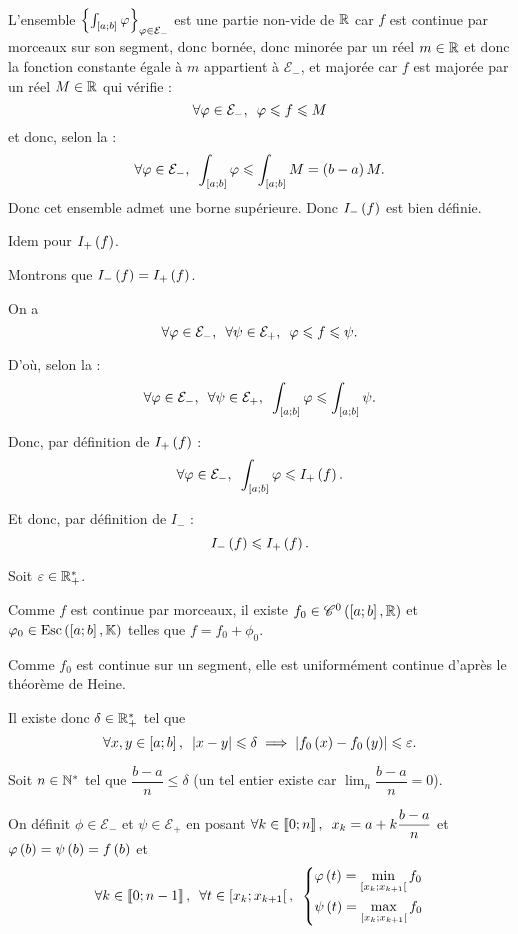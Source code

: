 \begin{dem}~\\
\newcommand{\Em}{\mathcal{E}_-}
\newcommand{\Ep}{\mathcal{E}_+}
L'ensemble \(\accol{\int_{\intervii{a}{b}}\phi}_{\phi\in\Em}\) est une partie non-vide de \(\mathbb{R}\) car \(f\) est continue par morceaux sur son segment, donc bornée, donc minorée par un réel \(m\in\mathbb{R}\) et donc la fonction constante égale à \(m\) appartient à \(\Em\), et majorée car \(f\) est majorée par un réel \(M\in\mathbb{R}\) qui vérifie : \[\quantifs{\forall\phi\in\Em}\phi\leq f\leq M\] et donc, selon la  : \[\quantifs{\forall\phi\in\Em}\int_{\intervii{a}{b}}\phi\leq\int_{\intervii{a}{b}}M=\paren{b-a}M.\] Donc cet ensemble admet une borne supérieure. Donc \(I_-\left(f\right)\) est bien définie.

Idem pour \(I_+\left(f\right)\).

Montrons que \(I_-\left(f\right)=I_+\left(f\right)\).

\leqbox

On a \[\quantifs{\forall\phi\in\Em;\forall\psi\in\Ep}\phi\leq f\leq\psi.\]

D'où, selon la  : \[\quantifs{\forall\phi\in\Em;\forall\psi\in\Ep}\int_{\intervii{a}{b}}\phi\leq\int_{\intervii{a}{b}}\psi.\]

Donc, par définition de \(I_+\left(f\right)\) : \[\quantifs{\forall\phi\in\Em}\int_{\intervii{a}{b}}\phi\leq I_+\paren{f}.\]

Et donc, par définition de \(I_-\) : \[I_-\left(f\right)\leqslant I_+\left(f\right).\]

\geqbox

Soit \(\varepsilon\in\mathbb{R}_+^*\).

Comme \(f\) est continue par morceaux, il existe \(f_0\in\mathscr{C}^{0}\left(\left[a;b\right],\mathbb{R}\right)\) et \(\phi_0\in\Esc\) telles que \(f=f_0+\phi_0\).

Comme \(f_0\) est continue sur un segment, elle est uniformément continue d'après le théorème de Heine.

Il existe donc \(\delta\in\mathbb{R}_+^*\) tel que \[\quantifs{\forall x,y\in\intervii{a}{b}}\abs{x-y}\leq\delta\imp\abs{f_0\paren{x}-f_0\paren{y}}\leq\epsilon.\]

Soit \(n\in\mathbb{N}^*\) tel que \(\dfrac{b-a}{n}\leq\delta\) (un tel entier existe car \(\lim_n\dfrac{b-a}{n}=0\)).

On définit \(\phi\in\Em\) et \(\psi\in\Ep\) en posant \(\quantifs{\forall k\in\interventierii{0}{n}}x_k=a+k\dfrac{b-a}{n}\) et  \(\varphi\left(b\right)=\psi\left(b\right)=f\left(b\right)\) et \[\quantifs{\forall k\in\interventierii{0}{n-1};\forall t\in\intervie{x_k}{x_{k+1}}}\begin{dcases}\phi\paren{t}=\min_{\intervie{x_k}{x_{k+1}}}f_0 \\ \psi\paren{t}=\max_{\intervie{x_k}{x_{k+1}}}f_0\end{dcases}\]


\end{dem}
